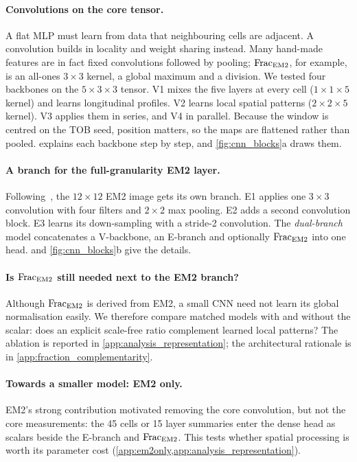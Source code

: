 \paragraph{Convolutions on the core tensor.}
A flat MLP must learn from data that neighbouring cells are adjacent. A convolution builds in locality and weight sharing instead. Many hand-made features are in fact fixed convolutions followed by pooling; $\mathrm{Frac}_{\mathrm{EM2}}$, for example, is an all-ones $3\times3$ kernel, a global maximum and a division. We tested four backbones on the $5\times3\times3$ tensor. V1 mixes the five layers at every cell ($1\times1\times5$ kernel) and learns longitudinal profiles. V2 learns local spatial patterns ($2\times2\times5$ kernel). V3 applies them in series, and V4 in parallel. Because the window is centred on the TOB seed, position matters, so the maps are flattened rather than pooled.  explains each backbone step by step, and \cref{fig:cnn_blocks}a draws them.

\paragraph{A branch for the full-granularity EM2 layer.}
Following~\cite{ayyar2020cnn,icecube2025cnn,kim2023hotspots}, the $12\times12$ EM2 image gets its own branch. E1 applies one $3\times3$ convolution with four filters and $2\times2$ max pooling. E2 adds a second convolution block. E3 learns its down-sampling with a stride-2 convolution. The \emph{dual-branch} model concatenates a V-backbone, an E-branch and optionally $\mathrm{Frac}_{\mathrm{EM2}}$ into one head.  and \cref{fig:cnn_blocks}b give the details.

\paragraph{Is $\mathrm{Frac}_{\mathrm{EM2}}$ still needed next to the EM2 branch?}
Although $\mathrm{Frac}_{\mathrm{EM2}}$ is derived from EM2, a small CNN need not learn its global normalisation easily. We therefore compare matched models with and without the scalar: does an explicit scale-free ratio complement learned local patterns? The ablation is reported in \cref{app:analysis_representation}; the architectural rationale is in \cref{app:fraction_complementarity}.

\paragraph{Towards a smaller model: EM2 only.}
EM2's strong contribution motivated removing the core convolution, but not the core measurements: the 45 cells or 15 layer summaries enter the dense head as scalars beside the E-branch and $\mathrm{Frac}_{\mathrm{EM2}}$. This tests whether spatial processing is worth its parameter cost (\cref{app:em2only,app:analysis_representation}).

